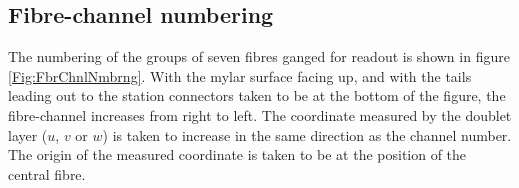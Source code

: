 
\subsection{Fibre-channel numbering}
\label{SubSect:FbrNmbrng}

The numbering of the groups of seven fibres ganged for readout is shown in figure \ref{Fig:FbrChnlNmbrng}. With the mylar surface facing up, and with the tails leading out to the station connectors taken to be at the bottom of the figure, the fibre-channel increases from right to left. The coordinate measured by the doublet layer ($u$, $v$ or $w$) is taken to increase in the same direction as the channel number. The origin of the measured coordinate is taken to be at the position of the central fibre.

